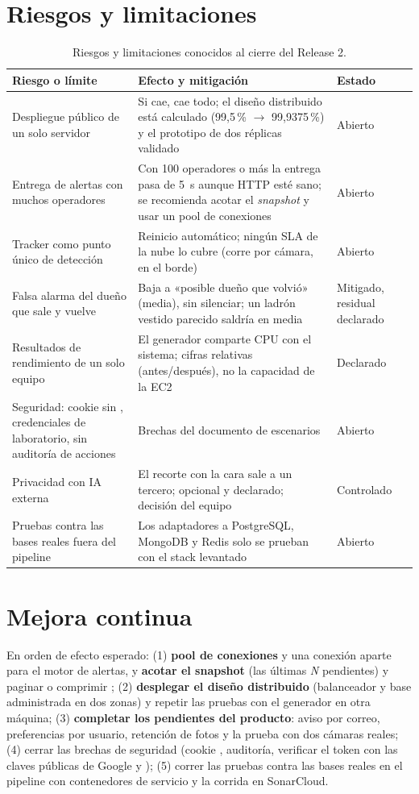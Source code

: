 \section{Riesgos y limitaciones}
\begin{table}[H]
\centering\small
\caption{Riesgos y limitaciones conocidos al cierre del Release 2.}\label{tab:riesgos}
\begin{tabularx}{\textwidth}{lYl}
\toprule
\textbf{Riesgo o límite} & \textbf{Efecto y mitigación} & \textbf{Estado} \\
\midrule
Despliegue público de un solo servidor & Si cae, cae todo; el diseño distribuido está calculado (99,5\,\% $\rightarrow$ 99,9375\,\%) y el prototipo de dos réplicas validado & Abierto \\
Entrega de alertas con muchos operadores & Con 100 operadores o más la entrega pasa de 5~s aunque HTTP esté sano; se recomienda acotar el \emph{snapshot} y usar un pool de conexiones & Abierto \\
Tracker como punto único de detección & Reinicio automático; ningún SLA de la nube lo cubre (corre por cámara, en el borde) & Abierto \\
Falsa alarma del dueño que sale y vuelve & Baja a «posible dueño que volvió» (media), sin silenciar; un ladrón vestido parecido saldría en media & Mitigado, residual declarado \\
Resultados de rendimiento de un solo equipo & El generador comparte CPU con el sistema; cifras relativas (antes/después), no la capacidad de la EC2 & Declarado \\
Seguridad: cookie sin , credenciales de laboratorio, sin auditoría de acciones & Brechas del documento de escenarios & Abierto \\
Privacidad con IA externa & El recorte con la cara sale a un tercero; opcional y declarado; decisión del equipo & Controlado \\
Pruebas contra las bases reales fuera del pipeline & Los adaptadores a PostgreSQL, MongoDB y Redis solo se prueban con el stack levantado & Abierto \\
\bottomrule
\end{tabularx}
\end{table}

\section{Mejora continua}
En orden de efecto esperado: (1) \textbf{pool de conexiones} y una conexión aparte para el motor de alertas, y \textbf{acotar el snapshot}
(las últimas \emph{N} pendientes) y paginar o comprimir ; (2) \textbf{desplegar el diseño distribuido} (balanceador y base
administrada en dos zonas) y repetir las pruebas con el generador en otra máquina; (3) \textbf{completar los pendientes del producto}: aviso por
correo, preferencias por usuario, retención de fotos y la prueba con dos cámaras reales; (4) cerrar las brechas de seguridad (cookie ,
auditoría, verificar el token con las claves públicas de Google y ); (5) correr las pruebas contra las bases reales en el pipeline con
contenedores de servicio y la corrida en SonarCloud.


